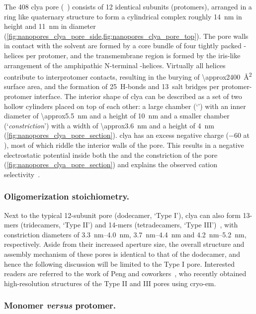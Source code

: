 The \SI{408}{\kDa} \gls{clya} pore (~\cite{Peng-2019}) consists of 12 identical subunits
(protomers), arranged in a ring like quaternary structure to form a cylindrical complex roughly \SI{14}{\nm}
in height and \SI{11}{\nm} in diameter (\cref{fig:nanopores_clya_pore_side,fig:nanopores_clya_pore_top}). The
pore walls in contact with the solvent are formed by a core bundle of four tightly packed \ta-helices per
protomer, and the transmembrane region is formed by the iris-like arrangement of the amphipathic N-terminal
\ta-helices. Virtually all helices contribute to interprotomer contacts, resulting in the burying of
\SI{\approx2400}{\square\angstrom} surface area, and the formation of 25~H-bonds and 13~salt bridges per
protomer-protomer interface. The interior shape of \gls{clya} can be described as a set of two hollow
cylinders placed on top of each other: a large \cisi{} chamber (`\lumen{}') with an inner diameter of
\SI{\approx5.5}{\nm} and a height of \SI{10}{\nm} and a smaller \transi{} chamber (`\textit{constriction}')
with a width of \SI{\approx3.6}{\nm} and a height of \SI{4}{\nm} (\cref{fig:nanopores_clya_pore_section}).
\Gls{clya} has an excess negative charge (\SI{-60}{\ec} at ), most of which riddle the interior walls
of the pore. This results in a negative electrostatic potential inside both the \lumen{} and the constriction
of the pore (\cref{fig:nanopores_clya_pore_section}) and explains the observed cation
selectivity~\cite{Soskine-2012,Franceschini-2016}.

\subsubsection{Oligomerization stoichiometry.}
%

Next to the typical 12-subunit pore (dodecamer, `Type I'), \gls{clya} can also form 13-mers (tridecamers,
`Type II') and 14-mers (tetradecamers, `Type III')~\cite{Soskine-2013,Peng-2019}, with constriction diameters
of \SIrange{3.3}{4.0}{\nm}, \SIrange{3.7}{4.4}{\nm} and \SIrange{4.2}{5.2}{\nm}, respectively. Aside from
their increased aperture size, the overall structure and assembly mechanism of these pores is identical to
that of the dodecamer, and hence the following discussion will be limited to the Type I pore. Interested
readers are referred to the work of Peng and coworkers~\cite{Peng-2019}, who recently obtained high-resolution
structures of the Type II and III pores using \gls{cryo-em}.


\subsubsection{Monomer \textit{versus} protomer.}
%

